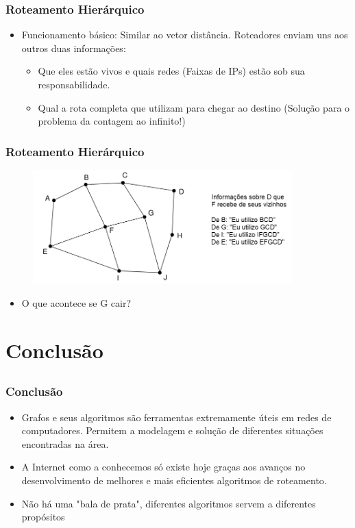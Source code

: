 \documentclass{beamer}
\begin{document}
\begin{frame}
\frametitle{Roteamento Hierárquico}
\begin{itemize}
  \item Funcionamento básico: Similar ao vetor distância. Roteadores enviam uns
  aos outros duas informações:
  \begin{itemize}
    \item Que eles estão vivos e quais redes (Faixas de IPs) estão sob sua
    responsabilidade.
    \item Qual a rota completa que utilizam para chegar ao destino (Solução para
    o problema da contagem ao infinito!)
  \end{itemize}
\end{itemize}
\end{frame}

\begin{frame}
\frametitle{Roteamento Hierárquico}
\begin{figure}[htp]
\begin{center}
  \includegraphics[width=100mm]{Imagens/RoteamentoHierarquico.png}
  \label{roteamento_hierarquico}
\end{center}
\end{figure}
\begin{itemize}
  \item O que acontece se G cair?
\end{itemize}
\end{frame}


\section{Conclusão}
\subsection{}

\begin{frame}
\frametitle{Conclusão}
\begin{itemize}
  \setlength{\itemsep}{0.7cm}%
  \item Grafos e seus algoritmos são ferramentas extremamente úteis em redes de
  computadores. Permitem a modelagem e solução de diferentes situações encontradas na área.
  \item A Internet como a conhecemos só existe hoje graças aos avanços no
  desenvolvimento de melhores e mais eficientes algoritmos de roteamento.
  \item Não há uma "bala de prata", diferentes algoritmos servem a diferentes
  propósitos
\end{itemize}
\end{frame}
\end{document}
